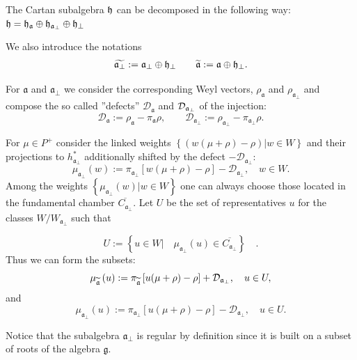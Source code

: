 \documentclass[preprint,12pt]{elsarticle}
\newcommand{\af}{\mathfrak{a}}
\newcommand{\afb}{\mathfrak{a}_{\bot}}
\begin{document}
The Cartan subalgebra $\frak{h}$ can be decomposed in the following way:  $\frak{h}=\frak{\frak{h}_{\af}}\oplus
\frak{h}_{\afb}\oplus \frak{h}_{\perp }$

We also introduce the notations
\begin{eqnarray}
\widetilde{\frak{a}_{\perp }} :=\frak{a}_{\perp }\oplus \frak{h}_{\perp }
\qquad
\widetilde{\frak{a}} :=\frak{a}\oplus \frak{h}_{\perp }.
\end{eqnarray}

For $\af$ and $\afb$ we consider the
corresponding Weyl vectors, $\rho _{\af}$ and $\rho _{\af_{\perp
}} $ and compose the so called ''defects'' $\mathcal{D}_{\af}$ and $\mathcal{%
D}_{\afb}$ of the injection:
\begin{equation}
\mathcal{D}_{\af}:=\rho _{\af}-\pi _{\af}\rho , \qquad
\mathcal{D}_{\afb}:=\rho _{\afb}-\pi _{\af%
_{\perp }}\rho .  \label{defect-ort}
\end{equation}

For $\mu \in P^{+}$ consider the linked weights $\left\{ \left(
w(\mu +\rho )-\rho \right) |w\in W\right\} $ and their projections
to
$h_{\afb}^{\ast }$ additionally shifted by the defect $-%
\mathcal{D}_{\afb}$:
\begin{equation*}
\mu _{\afb}\left( w\right) :=\pi _{\afb}\left[
w(\mu +\rho )-\rho \right] -\mathcal{D}_{\afb},\quad w\in W.
\end{equation*}
Among the weights $\left\{ \mu _{\af_{\perp
}}\left( w\right) |w\in W\right\} $ one can always choose those located in
the fundamental chamber $\overline{C_{\afb}}$. Let $U$ be the
set of representatives $u$ for the classes $W/W_{\afb}$ such
that

\begin{equation}
U:=\left\{ u\in W|\quad \mu _{\afb}\left( u\right) \in
\overline{C_{\afb}}\right\} \quad .  \label{U-def}
\end{equation}
Thus we can form the subsets:
\begin{equation}
\mu _{\widetilde{\mathfrak{a}}}\left( u\right) :=\pi _{\widetilde{%
\mathfrak{a}}}\left[ u(\mu +\rho )-\rho \right] +\mathcal{D}_{\af%
_{\perp }},\quad u\in U,  \label{mu-a}
\end{equation}
and
\begin{equation}
\mu _{\afb}\left( u\right) :=\pi _{\afb}\left[
u(\mu +\rho )-\rho \right] -\mathcal{D}_{\afb},\quad u\in U.
\label{mu-a-tilda}
\end{equation}

Notice that the subalgebra $\mathfrak{a}_{\bot}$ is regular by definition
since it is built on a subset of roots of the algebra $\mathfrak{g}$.
\end{document}
